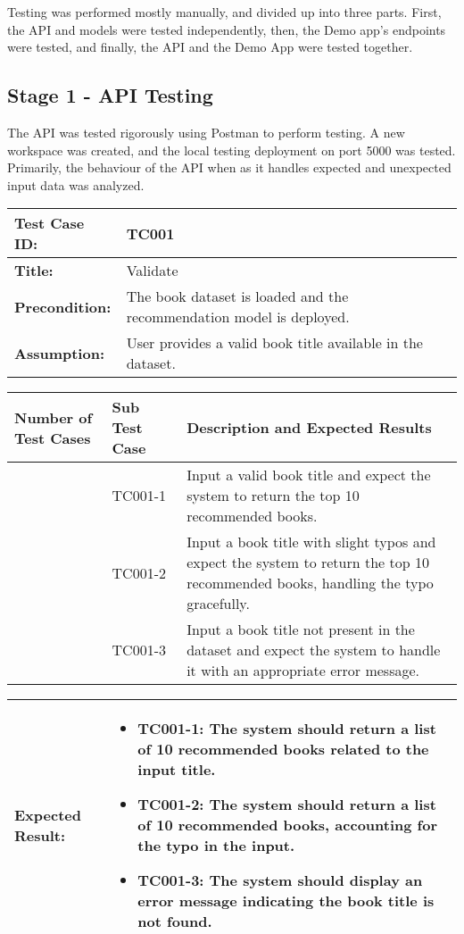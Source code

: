 Testing was performed mostly manually, and divided up into three parts. First, the API and models were tested independently, then, the Demo app's endpoints were tested, and finally, the API and the Demo App were tested together.

\subsection*{Stage 1 - API Testing}

The API was tested rigorously using Postman to perform testing. A new workspace was created, and the local testing deployment on port 5000 was tested. Primarily, the behaviour of the API when as it handles expected and unexpected input data was analyzed.

\noindent
\begin{tabularx}{\textwidth}{|>{\raggedright\arraybackslash}p{4cm}|X|}
    \hline
    \textbf{Test Case ID:} & TC001 \\ \hline
    \textbf{Title:} & Validate \texttt{} \\ \hline
    \textbf{Precondition:} & The book dataset is loaded and the recommendation model is deployed. \\ \hline
    \textbf{Assumption:} & User provides a valid book title available in the dataset. \\ \hline
\end{tabularx}

\noindent
\begin{tabularx}{\textwidth}{|>{\centering\arraybackslash}p{3cm}|>{\centering\arraybackslash}p{3cm}|X|}
    \hline
    \textbf{Number of Test Cases} & \textbf{Sub Test Case} & \textbf{Description and Expected Results} \\ \hline
    1 & TC001-1 & Input a valid book title and expect the system to return the top 10 recommended books. \\ \hline
    2 & TC001-2 & Input a book title with slight typos and expect the system to return the top 10 recommended books, handling the typo gracefully. \\ \hline
    3 & TC001-3 & Input a book title not present in the dataset and expect the system to handle it with an appropriate error message. \\ \hline
\end{tabularx}

\noindent
\begin{tabularx}{\textwidth}{|>{\raggedright\arraybackslash}p{4cm}|X|}
    \hline
    \textbf{Expected Result:} & 
    \begin{itemize}
        \item TC001-1: The system should return a list of 10 recommended books related to the input title.
        \item TC001-2: The system should return a list of 10 recommended books, accounting for the typo in the input.
        \item TC001-3: The system should display an error message indicating the book title is not found.
    \end{itemize}
    \\ \hline
\end{tabularx}

